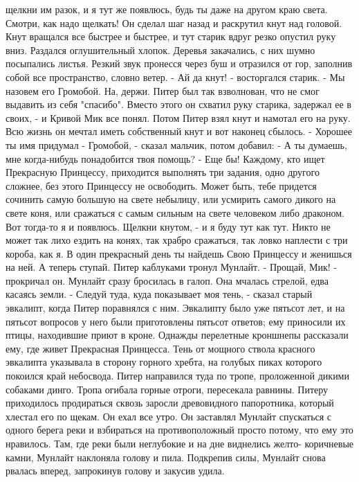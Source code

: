 щелкни им разок, и я тут же появлюсь, будь ты даже на другом краю 
света. Смотри, как надо щелкать!
    Он сделал шаг назад и раскрутил кнут над головой. Кнут вращался 
все быстрее и быстрее, и тут старик вдруг резко опустил руку вниз. 
Раздался оглушительный хлопок. Деревья закачались, с них шумно 
посыпались листья. Резкий звук пронесся через буш и отразился от гор, 
заполнив собой все пространство, словно ветер.
    - Ай да кнут! - восторгался старик. - Мы назовем его Громобой. На, 
держи.
    Питер был так взволнован, что не смог выдавить из себя "спасибо". 
Вместо этого он схватил руку старика, задержал ее в своих, - и Кривой 
Мик все понял. Потом Питер взял кнут и намотал его на руку. Всю жизнь 
он мечтал иметь собственный кнут и вот наконец сбылось.
    - Хорошее ты имя придумал - Громобой, - сказал мальчик, потом 
добавил: - А ты думаешь, мне когда-нибудь понадобится твоя помощь?
    - Еще бы! Каждому, кто ищет Прекрасную Принцессу, приходится 
выполнять три задания, одно другого сложнее, без этого Принцессу не 
освободить. Может быть, тебе придется сочинить самую большую на свете 
небылицу, или усмирить самого дикого на свете коня, или сражаться с 
самым сильным на свете человеком либо драконом. Вот тогда-то я и 
появлюсь. Щелкни кнутом, - и я буду тут как тут. Никто не может так 
лихо ездить на конях, так храбро сражаться, так ловко наплести с три 
короба, как я. В один прекрасный день ты найдешь Свою Принцессу и 
женишься на ней. А теперь ступай.
    Питер каблуками тронул Мунлайт.
    - Прощай, Мик! - прокричал он.
    Мунлайт сразу бросилась в галоп. Она мчалась стрелой, едва касаясь 
земли.
    - Следуй туда, куда показывает моя тень, - сказал старый эвкалипт, 
когда Питер поравнялся с ним. Эвкалипту было уже пятьсот лет, и на 
пятьсот вопросов у него были приготовлены пятьсот ответов; ему 
приносили их птицы, находившие приют в кроне. Однажды перелетные 
кроншнепы рассказали ему, где живет Прекрасная Принцесса.
    Тень от мощного ствола красного эвкалипта указывала в сторону 
горного хребта, на голубых пиках которого покоился край небосвода. 
Питер направился туда по тропе, проложенной дикими собаками динго. 
Тропа огибала горные отроги, пересекала равнины. Питеру приходилось 
продираться сквозь заросли древовидного папоротника, который хлестал 
его по щекам.
    Он ехал все утро. Он заставлял Мунлайт спускаться с одного берега 
реки и взбираться на противоположный просто потому, что ему это 
нравилось. Там, где реки были неглубокие и на дне виднелись желто-
коричневые камни, Мунлайт наклоняла голову и пила. Подкрепив силы, 
Мунлайт снова рвалась вперед, запрокинув голову и закусив удила.

